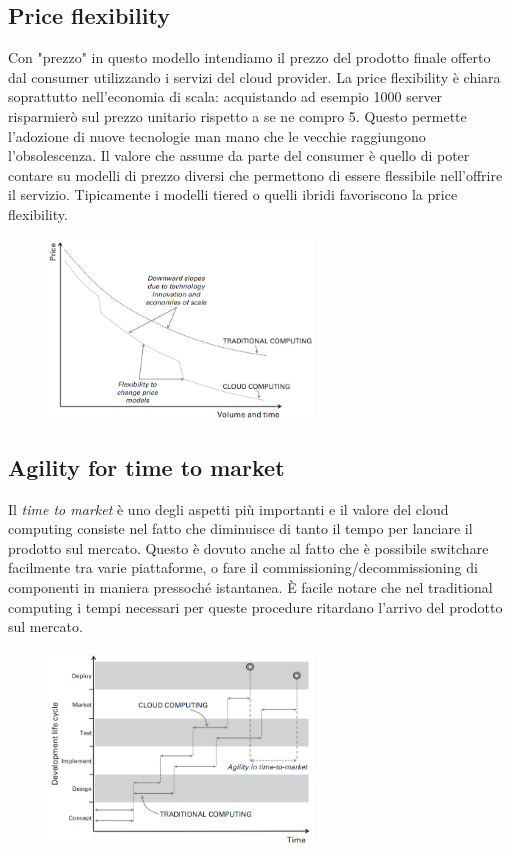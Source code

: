 \subsection{Price flexibility}
Con "prezzo" in questo modello intendiamo il prezzo del prodotto finale offerto dal consumer utilizzando i servizi del cloud provider. La price flexibility è chiara soprattutto nell'economia di scala: acquistando ad esempio 1000 server risparmierò sul prezzo unitario rispetto a se ne compro 5. Questo permette l'adozione di nuove tecnologie man mano che le vecchie raggiungono l'obsolescenza. Il valore che assume da parte del consumer è quello di poter contare su modelli di prezzo diversi che permettono di essere flessibile nell'offrire il servizio. Tipicamente i modelli tiered o quelli ibridi favoriscono la price flexibility.
\clearpage

\begin{figure}[hbt!]
    \centering
    \includegraphics[width=7cm]{./Images/cap6/6.6.png}
\end{figure}

\subsection{Agility for time to market}
Il \textit{time to market} è uno degli aspetti più importanti e il valore del cloud computing consiste nel fatto che diminuisce di tanto il tempo per lanciare il prodotto sul mercato. Questo è dovuto anche al fatto che è possibile switchare facilmente tra varie piattaforme, o fare il commissioning/decommissioning di componenti in maniera pressoché istantanea. È facile notare che nel traditional computing i tempi necessari per queste procedure ritardano l'arrivo del prodotto sul mercato.

\begin{figure}[hbt!]
    \centering
    \includegraphics[width=7cm]{./Images/cap6/6.7.png}
\end{figure}

